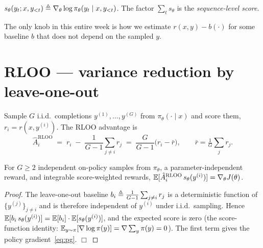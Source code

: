 \documentclass[11pt,oneside]{scrbook}
\begin{document}
\begin{definition}
$s_\theta(y_t; x, y_{<t}) \triangleq \nabla_\theta \log \pi_\theta(y_t \mid x, y_{<t})$.
The factor $\sum_t s_\theta$ is the \emph{sequence-level score}.
\end{definition}

The only knob in this entire week is how we estimate $r(x,y) - b(\cdot)$ for
some baseline $b$ that does not depend on the sampled $y$.

\section{RLOO --- variance reduction by leave-one-out}

\begin{definition}
Sample $G$ i.i.d.\ completions $y^{(1)},\dots,y^{(G)}$ from $\pi_\theta(\cdot \mid x)$
and score them, $r_i = r(x, y^{(i)})$. The RLOO advantage is
\[
  \hat A_i^{\text{RLOO}} \;=\; r_i \;-\; \frac{1}{G-1}\sum_{j \ne i} r_j
  \;=\; \frac{G}{G-1}\bigl(r_i - \bar r\bigr),
  \qquad \bar r = \tfrac{1}{G}\sum_j r_j.
\]
\end{definition}

\begin{theorem}\label{thm:rloo-unbiased}
For $G\ge2$ independent on-policy samples from $\pi_\theta$, a parameter-independent reward, and integrable score-weighted rewards, $\mathbb{E}[\hat A_i^{\text{RLOO}} \, s_\theta(y^{(i)})] = \nabla_\theta J(\theta)$.
\end{theorem}

\begin{proof}
The leave-one-out baseline $b_i \triangleq \tfrac{1}{G-1}\sum_{j \ne i} r_j$ is
a deterministic function of $\{y^{(j)}\}_{j \ne i}$ and is therefore
independent of $y^{(i)}$ under i.i.d.\ sampling. Hence
$\mathbb{E}[b_i \, s_\theta(y^{(i)})] = \mathbb{E}[b_i] \cdot \mathbb{E}[s_\theta(y^{(i)})]$, and the
expected score is zero (the score-function identity:
$\mathbb{E}_{y \sim \pi}[\nabla \log \pi(y)] = \nabla \sum_y \pi(y) = 0$). The first
term gives the policy gradient~\eqref{eq:pg}. $\Box$
\end{proof}
\end{document}
